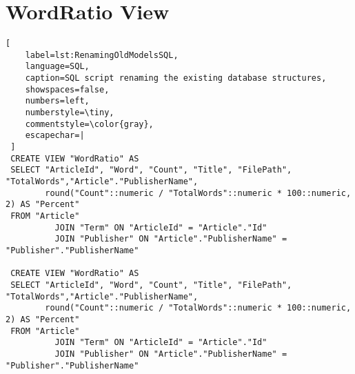 \section*{WordRatio View}\label{Appendix_WordRatioOld}
\begin{lstlisting}[
    label=lst:RenamingOldModelsSQL,
    language=SQL,
    caption=SQL script renaming the existing database structures,
    showspaces=false,
    numbers=left,
    numberstyle=\tiny,
    commentstyle=\color{gray},
    escapechar=|
 ]
 CREATE VIEW "WordRatio" AS
 SELECT "ArticleId", "Word", "Count", "Title", "FilePath", "TotalWords","Article"."PublisherName",
        round("Count"::numeric / "TotalWords"::numeric * 100::numeric, 2) AS "Percent"
 FROM "Article"
          JOIN "Term" ON "ArticleId" = "Article"."Id"
          JOIN "Publisher" ON "Article"."PublisherName" = "Publisher"."PublisherName"
 
 CREATE VIEW "WordRatio" AS
 SELECT "ArticleId", "Word", "Count", "Title", "FilePath", "TotalWords","Article"."PublisherName",
        round("Count"::numeric / "TotalWords"::numeric * 100::numeric, 2) AS "Percent"
 FROM "Article"
          JOIN "Term" ON "ArticleId" = "Article"."Id"
          JOIN "Publisher" ON "Article"."PublisherName" = "Publisher"."PublisherName"
\end{lstlisting}


